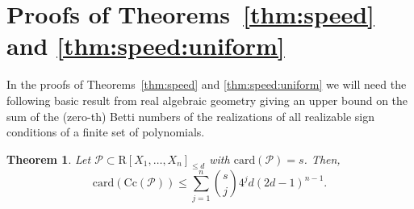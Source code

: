 \documentclass{amsart}[10pts]
\newtheorem{theorem}{Theorem}
\theoremstyle{definition}
\theoremstyle{remark}
\theoremstyle{observation}
\numberwithin{equation}{section}
\newcommand {\R} {\mathrm{R}}
\newcommand{\card}{\mathrm{card}}
\newcommand{\Cc}{\mathrm{Cc}}
\begin{document}
\section{Proofs of Theorems~\ref{thm:speed} and \ref{thm:speed:uniform}}
\label{sec:proof:3-4}
In the proofs of Theorems~\ref{thm:speed} and \ref{thm:speed:uniform}
we will need the following basic result from real algebraic geometry giving an upper bound on the sum of the (zero-th) Betti numbers of the realizations
of all realizable sign conditions of a finite set of polynomials.

\begin{theorem} \cite[Theorem 7.30]{BPRbook2}
\label{thm:OPTM}
    Let $\mathcal{P} \subset \R[X_1,\ldots,X_n]_{\leq d}$ with $\card(\mathcal{P}) = s$. Then,
    \[
    \card(\Cc(\mathcal{P})) \leq \sum_{j=1}^{n} \binom{s}{j} 4^j d(2d-1)^{n-1}.
    \]
\end{theorem}
\end{document}
